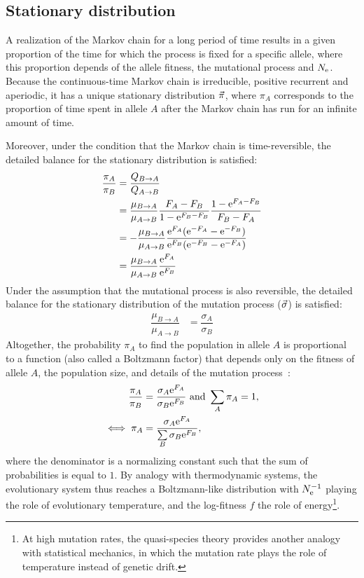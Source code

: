 \subsection{Stationary distribution}

A realization of the Markov chain for a long period of time results in a given proportion of the time for which the process is fixed for a specific allele, where this proportion depends of the allele fitness, the mutational process and $N_{\text{e}}$.
Because the continuous-time Markov chain is irreducible, positive recurrent and aperiodic, it has a unique stationary distribution $\vec{\pi}$, where $\pi_{A}$ corresponds to the proportion of time spent in allele $A$ after the Markov chain has run for an infinite amount of time.

Moreover, under the condition that the Markov chain is time-reversible, the detailed balance for the stationary distribution is satisfied:
\begin{align}
    \dfrac{\pi_{A}}{\pi_{B}} & = \dfrac{Q_{B \to A}}{Q_{A \to B}} \\
    & = \dfrac{\mu_{B \to A}}{\mu_{A \to B}}  \dfrac{F_{A}-F_{B}}{ 1 - \text{e}^{F_{B}-F_{B}}}  \dfrac{1 - \text{e}^{F_{A} - F_{B}} }{F_{B} - F_{A}}\\
    & = - \dfrac{\mu_{B \to A}}{\mu_{A \to B}}  \dfrac{ \text{e}^{F_{A}}(\text{e}^{-F_{A}} - \text{e}^{- F_{B}}) }{ \text{e}^{F_{B}}(\text{e}^{-F_{B}} - \text{e}^{- F_{A}})}  \\
    & = \dfrac{\mu_{B \to A}}{\mu_{A \to B}} \dfrac{\text{e}^{F_{A}}}{\text{e}^{F_{B}}} \\
\end{align}
Under the assumption that the mutational process is also reversible, the detailed balance for the stationary distribution of the mutation process ($\vec{\sigma}$) is satisfied:
\begin{align}
    \dfrac{\mu_{B \to A}}{\mu_{A \to B}} & = \dfrac{\sigma_{A}}{\sigma_{B}}
\end{align}
Altogether, the probability $\pi_{A}$ to find the population in allele $A$ is proportional to a function (also called a Boltzmann factor) that depends only on the fitness of allele $A$, the population size, and details of the mutation process~\citep{Sella2005,Mustonen2005}:
\begin{align}
    \dfrac{\pi_{A}}{\pi_{B}} & = \dfrac{\sigma_{A}\text{e}^{F_{A}}}{\sigma_{B}\text{e}^{F_{B}}} \text{ and } \sum\limits_{A}\pi_{A} = 1, \\
    \iff \pi_{A} & = \dfrac{\sigma_{A}\text{e}^{F_{A}}}{\sum\limits_{B} \sigma_{B}\text{e}^{F_{B}} }, \label{eq:equilibrium-mut-sel}
\end{align}
where the denominator is a normalizing constant such that the sum of probabilities is equal to $1$.
By analogy with thermodynamic systems, the evolutionary system thus reaches a Boltzmann-like distribution with $N_{\text{e}}^{-1}$ playing the role of evolutionary temperature, and the log-fitness $f$ the role of energy\footnote{At high mutation rates, the quasi-species theory provides another analogy with statistical mechanics, in which the mutation rate plays the role of temperature instead of genetic drift.}.


